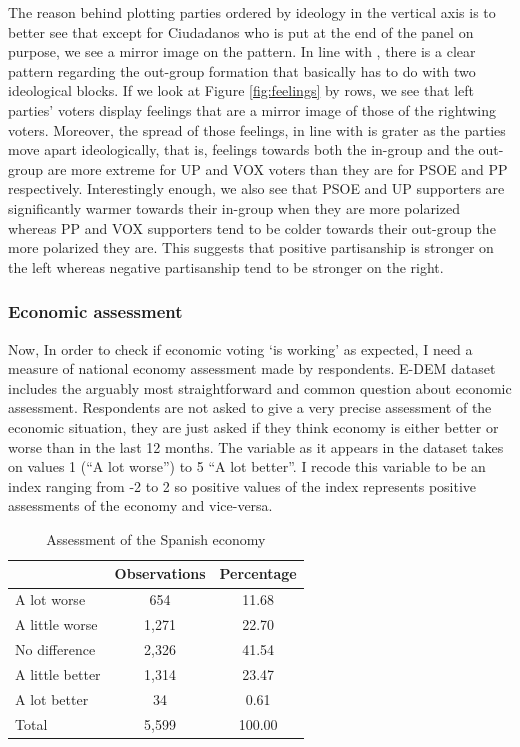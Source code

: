 \documentclass[a4paper, svgnames]{article}
\begin{document}
The reason behind plotting parties ordered by ideology in the vertical axis is to better see that except for Ciudadanos who is put at the end of the panel on purpose, we see a mirror image on the pattern. In line with \citep*{Orriols2020}, there is a clear pattern regarding the out-group formation that basically has to do with two ideological blocks. If we look at Figure \ref*{fig:feelings} by rows, we see that left parties' voters display feelings that are a mirror image of those of the rightwing voters. Moreover, the spread of those feelings, in line with \citep*{Wagner2021} is grater as the parties move apart ideologically, that is, feelings towards both the in-group and the  out-group are more extreme for UP and VOX voters than they are for PSOE and PP respectively. Interestingly enough, we also see that PSOE and UP supporters are significantly warmer towards their in-group when they are more polarized whereas PP and VOX supporters tend to be colder towards their out-group the more polarized they are. This suggests that positive partisanship is stronger on the left whereas negative partisanship tend to be stronger on the right.

\subsubsection{Economic assessment}

Now, In order to check if economic voting `is working' as expected, I need a measure of national economy assessment made by respondents. E-DEM dataset includes the arguably most straightforward and common question about economic assessment. Respondents are not asked to give a very precise assessment of the economic situation, they are just asked if they think economy is either better or worse than in the last 12 months.
The variable as it appears in the dataset takes on values 1 (``A lot worse'') to 5 ``A lot better''. I recode this variable to be an index ranging from -2 to 2 so positive values of the index represents positive assessments of the economy and vice-versa.

\begin{table}[H]
	\centering
	\caption{Assessment of the Spanish economy}
	\label{tab:economic assessment}
	\begin{tabular}{@{}lcc@{}}
		\toprule
		                & Observations & Percentage \\ \midrule
		A lot worse     & 654          & 11.68      \\
		A little worse  & 1,271        & 22.70      \\
		No difference   & 2,326        & 41.54      \\
		A little better & 1,314        & 23.47      \\
		A lot better    & 34           & 0.61       \\
		Total           & 5,599        & 100.00     \\ \bottomrule
	\end{tabular}
\end{table}
\end{document}
